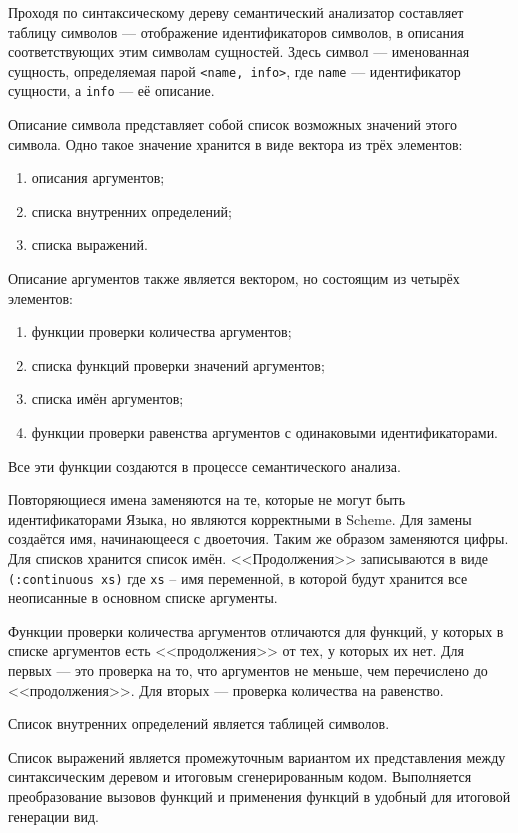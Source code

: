     Проходя по синтаксическому дереву семантический анализатор составляет таблицу символов --- отображение идентификаторов символов, в описания соответствующих этим символам сущностей\cite{skor}.
    Здесь символ --- именованная сущность, определяемая парой \verb!<name, info>!, где \verb,name, --- идентификатор сущности, а \verb,info, --- её описание.

    Описание символа представляет собой список возможных значений этого символа.
    Одно такое значение хранится в виде вектора из трёх элементов:
    \begin{enumerate}
        \item описания аргументов;
        \item списка внутренних определений;
        \item списка выражений.
    \end{enumerate}

    Описание аргументов также является вектором, но состоящим из четырёх элементов:
    \begin{enumerate}
        \item функции проверки количества аргументов;
        \item списка функций проверки значений аргументов;
        \item списка имён аргументов;
        \item функции проверки равенства аргументов с одинаковыми идентификаторами.
    \end{enumerate}
    Все эти функции создаются в процессе семантического анализа.

    Повторяющиеся имена заменяются на те, которые не могут быть идентификаторами Языка, но являются корректными в Scheme.
    Для замены создаётся имя, начинающееся с двоеточия.
    Таким же образом заменяются цифры.
    Для списков хранится список имён.
    <<Продолжения>> записываются в виде \verb,(:continuous xs), где \verb/xs/ -- имя переменной, в которой будут хранится все неописанные в основном списке аргументы.

    Функции проверки количества аргументов отличаются для функций, у которых в списке аргументов есть <<продолжения>> от тех, у которых их нет.
    Для первых --- это проверка на то, что аргументов не меньше, чем перечислено до <<продолжения>>.
    Для вторых --- проверка количества на равенство.

    Список внутренних определений является таблицей символов.

    Список выражений является промежуточным вариантом их представления между синтаксическим деревом и итоговым сгенерированным кодом.
    Выполняется преобразование вызовов функций и применения функций в удобный для итоговой генерации вид.

